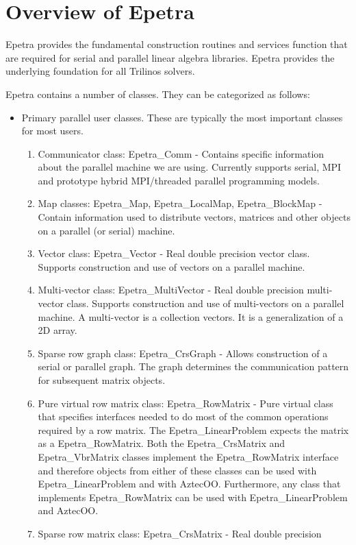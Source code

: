 \section{Overview of Epetra}

Epetra provides the fundamental construction
routines and services function that are required for serial and
parallel linear algebra libraries.  Epetra provides the underlying
foundation for all Trilinos solvers.

Epetra contains a number of classes.  They can be categorized as follows:
\begin{itemize}
\item Primary parallel user classes.  These are typically the most
  important classes for most users.
\begin{enumerate}
\item Communicator class: Epetra\_Comm - Contains specific information
  about the parallel machine we are using.  Currently supports serial,
  MPI and prototype hybrid MPI/threaded parallel programming models.
\item Map classes: Epetra\_Map, Epetra\_LocalMap, Epetra\_BlockMap -
  Contain information used to distribute vectors, matrices and other
  objects on a parallel (or serial) machine.
\item Vector class: Epetra\_Vector - Real double precision vector class.
  Supports construction and use of vectors on a parallel machine.
\item Multi-vector class: Epetra\_MultiVector - Real double precision
  multi-vector class.  Supports construction and use of multi-vectors on
  a parallel machine.  A multi-vector is a collection vectors.  It is a
  generalization of a 2D array.
\item Sparse row graph class: Epetra\_CrsGraph - Allows construction of a
  serial or parallel graph.  The graph determines the communication
  pattern for subsequent matrix objects.
\item Pure virtual row matrix class: Epetra\_RowMatrix - Pure virtual
  class that specifies interfaces needed to do most of the common
  operations required by a row matrix.  The Epetra\_LinearProblem expects
  the matrix as a Epetra\_RowMatrix.  Both the Epetra\_CrsMatrix and
  Epetra\_VbrMatrix classes implement the Epetra\_RowMatrix interface and
  therefore objects from either of these classes can be used with
  Epetra\_LinearProblem and with AztecOO.  Furthermore, any class that
  implements Epetra\_RowMatrix can be used with Epetra\_LinearProblem and
  AztecOO.
\item Sparse row matrix class: Epetra\_CrsMatrix - Real double precision

\end{enumerate}
\end{itemize}
